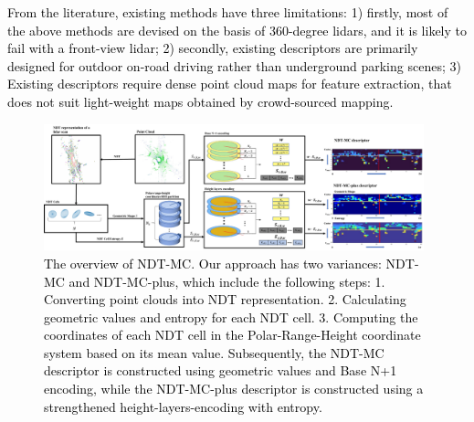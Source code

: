 \documentclass[letterpaper, 10 pt, conference]{ieeeconf}   %
\newcommand\kevin[1]{\textcolor{black}{#1}}
\begin{document}
\kevin{From the literature, existing methods have three limitations: 1) firstly, most of the above methods are devised on the basis of 360-degree lidars, and it is likely to fail with a front-view lidar; 2) secondly, existing descriptors are primarily designed for outdoor on-road driving rather than underground parking scenes; 3) Existing descriptors require dense point cloud maps for feature extraction, that does not suit light-weight maps obtained by crowd-sourced mapping.}


\begin{figure}[t]
 \centering  %
 \includegraphics[width=0.98\textwidth]{pipeline.pdf} 
 \caption{\kevin{The overview of NDT-MC. Our approach has two variances: NDT-MC and NDT-MC-plus, which include the following steps: 1. Converting point clouds into NDT representation. 2. Calculating geometric values and entropy for each NDT cell. 3. Computing the coordinates of each NDT cell in the Polar-Range-Height coordinate system based on its mean value. Subsequently, the NDT-MC descriptor is constructed using geometric values and Base N+1 encoding, while the NDT-MC-plus descriptor is constructed using a strengthened height-layers-encoding  with entropy.}}
 \label{pipeline}
\end{figure}
\end{document}
